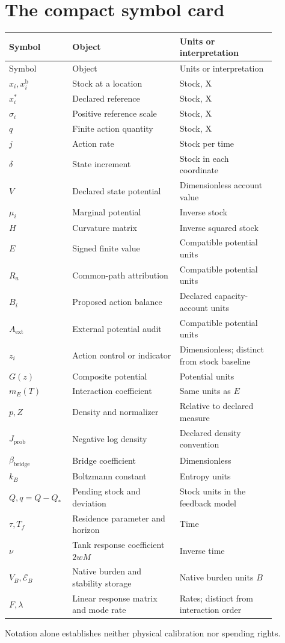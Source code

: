 \section*{The compact symbol card}
\begingroup\small
\begin{longtable}{P{0.16\linewidth}P{0.38\linewidth}P{0.34\linewidth}}\toprule
Symbol & Object & Units or interpretation\\\midrule
\endfirsthead
\toprule Symbol & Object & Units or interpretation\\\midrule
\endhead
$x_i,x_i^{\mathrm{b}}$ & Stock at a location & Stock, $\mathrm{X}$\\
$x_i^*$ & Declared reference & Stock, $\mathrm{X}$\\
$\sigma_i$ & Positive reference scale & Stock, $\mathrm{X}$\\
$q$ & Finite action quantity & Stock, $\mathrm{X}$\\
$j$ & Action rate & Stock per time\\
$\delta$ & State increment & Stock in each coordinate\\
$V$ & Declared state potential & Dimensionless account value\\
$\mu_i$ & Marginal potential & Inverse stock\\
$H$ & Curvature matrix & Inverse squared stock\\
$E$ & Signed finite value & Compatible potential units\\
$R_a$ & Common-path attribution & Compatible potential units\\
$B_i$ & Proposed action balance & Declared capacity-account units\\
$A_{\mathrm{ext}}$ & External potential audit & Compatible potential units\\
$z_i$ & Action control or indicator & Dimensionless; distinct from stock baseline\\
$G(z)$ & Composite potential & Potential units\\
$m_E(T)$ & Interaction coefficient & Same units as $E$\\
$p, Z$ & Density and normalizer & Relative to declared measure\\
$J_{\mathrm{prob}}$ & Negative log density & Declared density convention\\
$\beta_{\mathrm{bridge}}$ & Bridge coefficient & Dimensionless\\
$k_B$ & Boltzmann constant & Entropy units\\
$Q,q=Q-Q_*$ & Pending stock and deviation & Stock units in the feedback model\\
$\tau,T_f$ & Residence parameter and horizon & Time\\
$\nu$ & Tank response coefficient $2wM$ & Inverse time\\
$V_B,\mathcal E_B$ & Native burden and stability storage & Native burden units $B$\\
$F,\lambda$ & Linear response matrix and mode rate & Rates; distinct from interaction order\\\bottomrule
\end{longtable}
\endgroup

Notation alone establishes neither physical calibration nor spending rights.
